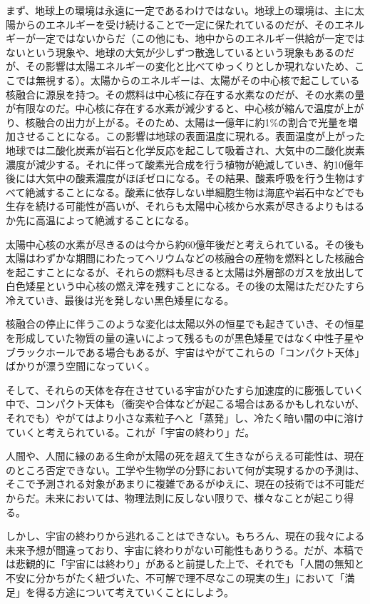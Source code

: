 \documentclass[8pt, a5paper]{ltjsarticle}
\begin{document}
まず、地球上の環境は永遠に一定であるわけではない。地球上の環境は、主に太陽からのエネルギーを受け続けることで一定に保たれているのだが、そのエネルギーが一定ではないからだ（この他にも、地中からのエネルギー供給が一定ではないという現象や、地球の大気が少しずつ散逸しているという現象もあるのだが、その影響は太陽エネルギーの変化と比べてゆっくりとしか現れないため、ここでは無視する）。太陽からのエネルギーは、太陽がその中心核で起こしている核融合に源泉を持つ。その燃料は中心核に存在する水素なのだが、その水素の量が有限なのだ。中心核に存在する水素が減少すると、中心核が縮んで温度が上がり、核融合の出力が上がる。そのため、太陽は一億年に約1\%の割合で光量を増加させることになる。この影響は地球の表面温度に現れる。表面温度が上がった地球では二酸化炭素が岩石と化学反応を起こして吸着され、大気中の二酸化炭素濃度が減少する。それに伴って酸素光合成を行う植物が絶滅していき、約10億年後には大気中の酸素濃度がほぼゼロになる。その結果、酸素呼吸を行う生物はすべて絶滅することになる。酸素に依存しない単細胞生物は海底や岩石中などでも生存を続ける可能性が高いが、それらも太陽中心核から水素が尽きるよりもはるか先に高温によって絶滅することになる。

太陽中心核の水素が尽きるのは今から約60億年後だと考えられている。その後も太陽はわずかな期間にわたってヘリウムなどの核融合の産物を燃料とした核融合を起こすことになるが、それらの燃料も尽きると太陽は外層部のガスを放出して白色矮星という中心核の燃え滓を残すことになる。その後の太陽はただひたすら冷えていき、最後は光を発しない黒色矮星になる。

核融合の停止に伴うこのような変化は太陽以外の恒星でも起きていき、その恒星を形成していた物質の量の違いによって残るものが黒色矮星ではなく中性子星やブラックホールである場合もあるが、宇宙はやがてこれらの「コンパクト天体」ばかりが漂う空間になっていく。

そして、それらの天体を存在させている宇宙がひたすら加速度的に膨張していく中で、コンパクト天体も（衝突や合体などが起こる場合はあるかもしれないが、それでも）やがてはより小さな素粒子へと「蒸発」し、冷たく暗い闇の中に溶けていくと考えられている。これが「宇宙の終わり」だ。

人間や、人間に縁のある生命が太陽の死を超えて生きながらえる可能性は、現在のところ否定できない。工学や生物学の分野において何が実現するかの予測は、そこで予測される対象があまりに複雑であるがゆえに、現在の技術では不可能だからだ。未来においては、物理法則に反しない限りで、様々なことが起こり得る。

しかし、宇宙の終わりから逃れることはできない。もちろん、現在の我々による未来予想が間違っており、宇宙に終わりがない可能性もありうる。だが、本稿では悲観的に「宇宙には終わり」があると前提した上で、それでも「人間の無知と不安に分かちがたく紐づいた、不可解で理不尽なこの現実の生」において「満足」を得る方途について考えていくことにしよう。
\end{document}
